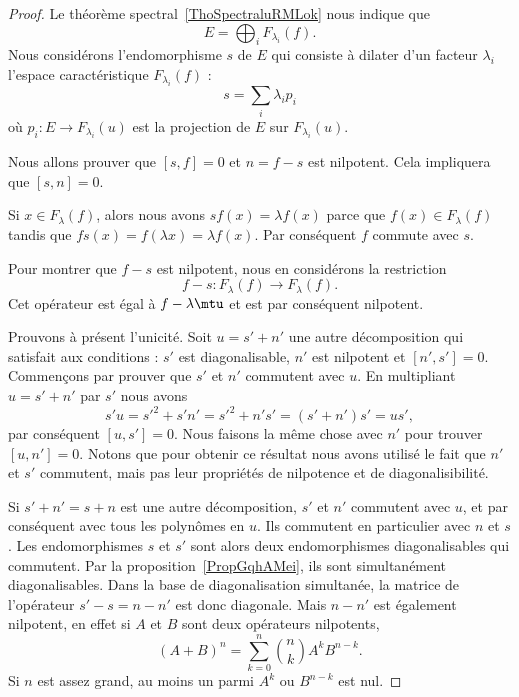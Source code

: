 \begin{proof}
    Le théorème spectral~\ref{ThoSpectraluRMLok} nous indique que
    \begin{equation}
        E=\bigoplus_iF_{\lambda_i}(f).
    \end{equation}
    Nous considérons l'endomorphisme \( s\) de \( E\) qui consiste à dilater d'un facteur \( \lambda_i\) l'espace caractéristique \( F_{\lambda_i}(f)\) :
    \begin{equation}
        s=\sum_i\lambda_ip_i
    \end{equation}
    où \( p_i\colon E\to F_{\lambda_i}(u)\) est la projection de \( E\) sur \( F_{\lambda_i}(u)\).

    Nous allons prouver que \( [s,f]=0\) et \( n=f-s\) est nilpotent. Cela impliquera que \( [s,n]=0\).

    Si \( x\in F_{\lambda}(f)\), alors nous avons \( sf(x)=\lambda f(x)\) parce que \( f(x)\in F_{\lambda}(f)\) tandis que \( fs(x)=f(\lambda x)=\lambda f(x)\). Par conséquent \( f\) commute avec \( s\).

    Pour montrer que \( f-s\) est nilpotent, nous en considérons la restriction
    \begin{equation}
        f-s\colon F_{\lambda}(f)\to F_{\lambda}(f).
    \end{equation}
    Cet opérateur est égal à \( f-\lambda\mtu\) et est par conséquent nilpotent.

    Prouvons à présent l'unicité. Soit \( u=s'+n'\) une autre décomposition qui satisfait aux conditions : \( s'\) est diagonalisable, \( n'\) est nilpotent et \( [n',s']=0\). Commençons par prouver que \( s'\) et \( n'\) commutent avec \( u\). En multipliant \( u=s'+n'\) par \( s'\) nous avons
    \begin{equation}
        s'u=s'^2+s'n'=s'^2+n's'=(s'+n')s'=us',
    \end{equation}
    par conséquent \( [u,s']=0\). Nous faisons la même chose avec \( n'\) pour trouver \( [u,n']=0\). Notons que pour obtenir ce résultat nous avons utilisé le fait que \( n'\) et \( s'\) commutent, mais pas leur propriétés de nilpotence et de diagonalisibilité.


    Si \( s'+n'=s+n\) est une autre décomposition, \( s'\) et \( n'\) commutent avec \( u\), et par conséquent avec tous les polynômes en \( u\). Ils commutent en particulier avec \( n\) et \( s\). Les endomorphismes \( s\) et \( s'\) sont alors deux endomorphismes diagonalisables qui commutent. Par la proposition~\ref{PropGqhAMei}, ils sont simultanément diagonalisables. Dans la base de diagonalisation simultanée, la matrice de l'opérateur \( s'-s=n-n'\) est donc diagonale. Mais \( n-n'\) est également nilpotent, en effet si \( A\) et \( B\) sont deux opérateurs nilpotents,
    \begin{equation}
        (A+B)^n=\sum_{k=0}^n\binom{n}{k}A^kB^{n-k}.
    \end{equation}
    Si \( n\) est assez grand, au moins un parmi \( A^k\) ou \( B^{n-k}\) est nul.


\end{proof}
